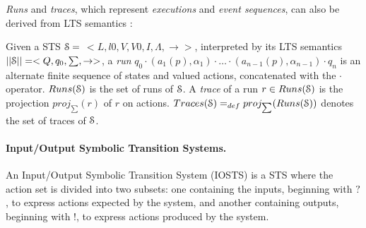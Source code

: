 \emph{Runs} and \emph{traces}, which represent \emph{executions}
and \emph{event sequences}, can also be derived from LTS
semantics \cite{jeron2006model}:

\begin{definition}
    Given a STS $\EuScript{S}=$ $<L,l0,V,V0,I,\Lambda,
    \rightarrow>$, interpreted by its LTS semantics
    $||\EuScript{S}||=<Q,q_0,\sum,\rightarrow>$, a \emph{run}
    $q_0 \cdot (a_1(p), \alpha_1) \cdot \dots \cdot
    (a_{n-1}(p),\alpha_{n-1}) \cdot q_n$
    is an alternate finite sequence of states and valued actions,
    concatenated with the $\cdot$ operator. $Runs(\EuScript{S})$
    is the set of runs of $\EuScript{S}$.
    A \emph{trace} of a run $r \in Runs(\EuScript{S})$ is the
    projection $proj_{\sum}(r)$ of $r$ on actions.
    $Traces(\EuScript{S}) =_{def} proj_{\sum}(Runs(\EuScript{S}))$
    denotes the set of traces of $\EuScript{S}$.

    \label{def:runs-and-traces}
\end{definition}

\paragraph{Input/Output Symbolic Transition Systems.}
\label{sec:definitions:iosts}

An Input/Output Symbolic Transition System (IOSTS)
\cite{Rusu:2000:AST:647982.743536} is a STS where the action set
is divided into two subsets: one containing the inputs, beginning
with $?$, to express actions expected by the system, and another
containing outputs, beginning with $!$, to express actions
produced by the system.

